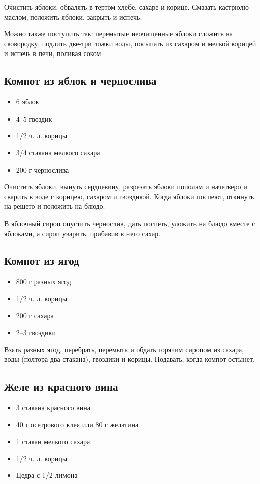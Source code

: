 Очистить яблоки, обвалять в тертом хлебе, сахаре и корице. Смазать кастрюлю маслом, положить яблоки, закрыть и испечь.

Можно также поступить так: перемытые неочищенные яблоки сложить на сковородку, подлить две-три ложки воды, посыпать их сахаром и мелкой корицей и испечь в печи, поливая соком.

\subsection{Компот из яблок и чернослива}

\begin{itemize}
	\item 6 яблок
    \item 4–5 гвоздик
    \item 1/2 ч. л. корицы
    \item 3/4 стакана мелкого сахара 
    \item 200 г чернослива
\end{itemize}

Очистить яблоки, вынуть сердцевину, разрезать яблоки пополам и начетверо и сварить в воде с корицею, сахаром и гвоздикой. Когда яблоки поспеют, откинуть на решето и положить на блюдо.

В яблочный сироп опустить чернослив, дать поспеть, уложить на блюдо вместе с яблоками, а сироп уварить, прибавив в него сахар.

\subsection{Компот из ягод}

\begin{itemize}
	\item 800 г разных ягод 
    \item 1/2 ч. л. корицы 
    \item 200 г сахара 
    \item 2–3 гвоздики
\end{itemize}

Взять разных ягод, перебрать, перемыть и обдать горячим сиропом из сахара, воды (полтора-два стакана), гвоздики и корицы. Подавать, когда компот остынет.

\subsection{Желе из красного вина}

\begin{itemize}
	\item 3 стакана красного вина
    \item 40 г осетрового клея или 80 г желатина 
    \item 1 стакан мелкого сахара
    \item 1/2 ч. л. корицы 
    \item Цедра с 1/2 лимона
\end{itemize}

